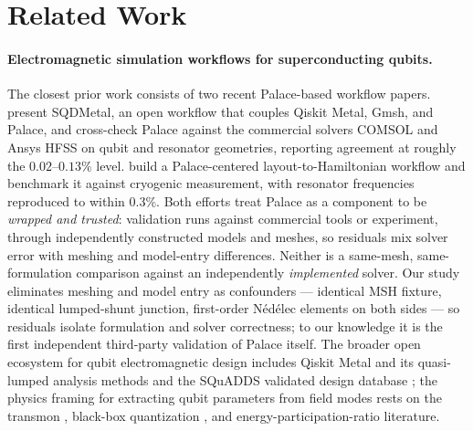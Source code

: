 \documentclass{anvil-paper}
\begin{document}
\section{Related Work}
\label{sec:related}

\paragraph{Electromagnetic simulation workflows for superconducting qubits.}
The closest prior work consists of two recent Palace-based workflow papers.
\citet{sommers2025open} present SQDMetal, an open workflow that couples
Qiskit Metal, Gmsh, and Palace, and cross-check Palace against the
commercial solvers COMSOL and Ansys HFSS on qubit and resonator geometries,
reporting agreement at roughly the $0.02$--$0.13\%$ level.
\citet{ye2025electromagnetic} build a Palace-centered layout-to-Hamiltonian
workflow and benchmark it against cryogenic measurement, with resonator
frequencies reproduced to within $0.3\%$. Both efforts treat Palace as a
component to be \emph{wrapped and trusted}: validation runs against
commercial tools or experiment, through independently constructed models
and meshes, so residuals mix solver error with meshing and model-entry
differences. Neither is a same-mesh, same-formulation comparison against an
independently \emph{implemented} solver. Our study eliminates meshing and
model entry as confounders --- identical MSH fixture, identical lumped-shunt
junction, first-order N\'ed\'elec elements on both sides --- so residuals
isolate formulation and solver correctness; to our knowledge it is the
first independent third-party validation of Palace itself. The broader
open ecosystem for qubit electromagnetic design includes Qiskit Metal and
its quasi-lumped analysis methods \citep{minev2021circuit} and the SQuADDS
validated design database \citep{shanto2024squadds}; the physics framing
for extracting qubit parameters from field modes rests on the transmon
\citep{koch2007}, black-box quantization \citep{nigg2012}, and
energy-participation-ratio \citep{minev2021} literature.
\end{document}
